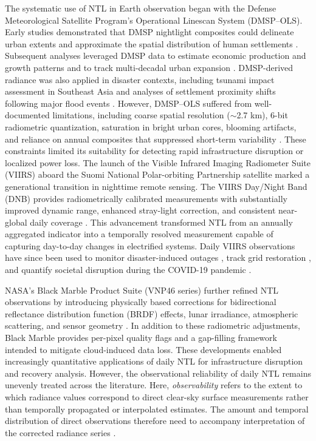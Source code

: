 \documentclass[]{interact}
\theoremstyle{plain}%
\theoremstyle{definition}
\theoremstyle{remark}
\begin{document}
    The systematic use of NTL in Earth observation began with the Defense Meteorological Satellite Program’s Operational Linescan System (DMSP–OLS). Early studies demonstrated that DMSP nightlight composites could delineate urban extents and approximate the spatial distribution of human settlements \citep{Elvidge1997,Small2005_RSE_UrbanExtent}. Subsequent analyses leveraged DMSP data to estimate economic production and growth patterns \citep{Chen2011,Henderson2012} and to track multi-decadal urban expansion \citep{Small2005_RSE_UrbanExtent}. DMSP-derived radiance was also applied in disaster contexts, including tsunami impact assessment in Southeast Asia \citep{Gillespie2014_RSL_Tsunami} and analyses of settlement proximity shifts following major flood events \citep{Mard2018_SciAdv_FloodProximity}. However, DMSP–OLS suffered from well-documented limitations, including coarse spatial resolution ($\sim$2.7 km), 6-bit radiometric quantization, saturation in bright urban cores, blooming artifacts, and reliance on annual composites that suppressed short-term variability \citep{Small2005_RSE_UrbanExtent}. These constraints limited its suitability for detecting rapid infrastructure disruption or localized power loss. The launch of the Visible Infrared Imaging Radiometer Suite (VIIRS) aboard the Suomi National Polar-orbiting Partnership satellite marked a generational transition in nighttime remote sensing. The VIIRS Day/Night Band (DNB) provides radiometrically calibrated measurements with substantially improved dynamic range, enhanced stray-light correction, and consistent near-global daily coverage \citep{Miller2013_RS_VIIRS_DNB,Kyba2015_RS_HighResNight}. This advancement transformed NTL from an annually aggregated indicator into a temporally resolved measurement capable of capturing day-to-day changes in electrified systems. Daily VIIRS observations have since been used to monitor disaster-induced outages \citep{Zhao2018_RS_DisasterAssessment,Zhao2020_AppliedGeography_PR}, track grid restoration \citep{Roman2019_PLOSone_Maria}, and quantify societal disruption during the COVID-19 pandemic \citep{Elvidge2020_RS_COVID_China,Ghosh2020_RS_COVID_India,Stokes2022_SciRep_MENA_COVID}.

    NASA’s Black Marble Product Suite (VNP46 series) further refined NTL observations by introducing physically based corrections for bidirectional reflectance distribution function (BRDF) effects, lunar irradiance, atmospheric scattering, and sensor geometry \citep{Roman2018_RSE_BlackMarble}. In addition to these radiometric adjustments, Black Marble provides per-pixel quality flags and a gap-filling framework intended to mitigate cloud-induced data loss. These developments enabled increasingly quantitative applications of daily NTL for infrastructure disruption and recovery analysis. However, the observational reliability of daily NTL remains unevenly treated across the literature. Here, \textit{observability} refers to the extent to which radiance values correspond to direct clear-sky surface measurements rather than temporally propagated or interpolated estimates. The amount and temporal distribution of direct observations therefore need to accompany interpretation of the corrected radiance series \citep{Zhao2019_RS_Review,Zheng2023_ISPRSJPRS_UrbanReview,Levin2025_RSE_NTL_Agenda}.
\end{document}
